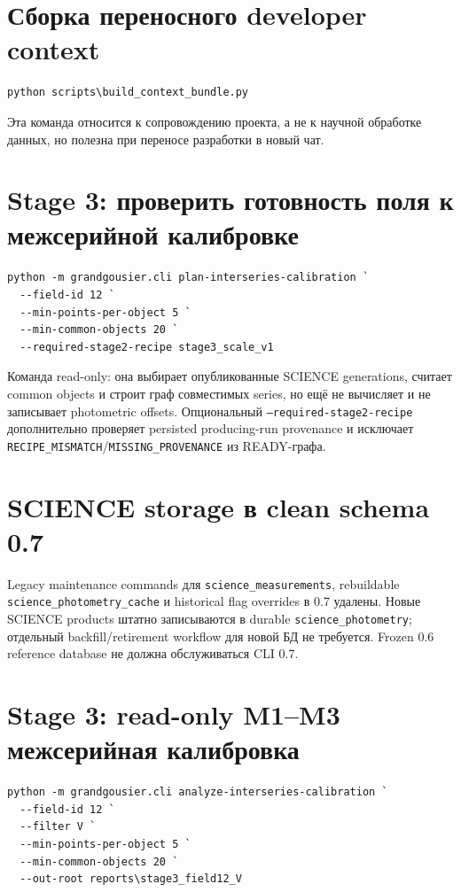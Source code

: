 \section{Сборка переносного developer context}

\begin{lstlisting}
python scripts\build_context_bundle.py
\end{lstlisting}

Эта команда относится к сопровождению проекта, а не к научной обработке данных, но полезна при переносе разработки в новый чат.

\section{Stage 3: проверить готовность поля к межсерийной калибровке}

\begin{lstlisting}
python -m grandgousier.cli plan-interseries-calibration `
  --field-id 12 `
  --min-points-per-object 5 `
  --min-common-objects 20 `
  --required-stage2-recipe stage3_scale_v1
\end{lstlisting}

Команда read-only: она выбирает опубликованные SCIENCE generations, считает common objects и строит граф совместимых series, но ещё не вычисляет и не записывает photometric offsets. Опциональный \texttt{--required-stage2-recipe} дополнительно проверяет persisted producing-run provenance и исключает \texttt{RECIPE\_MISMATCH}/\texttt{MISSING\_PROVENANCE} из READY-графа.

\section{SCIENCE storage в clean schema 0.7}

Legacy maintenance commands для \texttt{science\_measurements}, rebuildable
\texttt{science\_photometry\_cache} и historical flag overrides в 0.7 удалены.
Новые SCIENCE products штатно записываются в durable
\texttt{science\_photometry}; отдельный backfill/retirement workflow для новой
БД не требуется. Frozen 0.6 reference database не должна обслуживаться CLI 0.7.

\section{Stage 3: read-only M1--M3 межсерийная калибровка}

\begin{lstlisting}
python -m grandgousier.cli analyze-interseries-calibration `
  --field-id 12 `
  --filter V `
  --min-points-per-object 5 `
  --min-common-objects 20 `
  --out-root reports\stage3_field12_V
\end{lstlisting}

